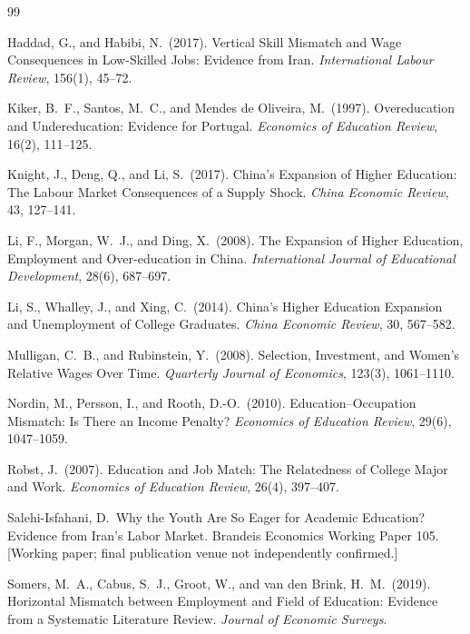 \documentclass[11pt]{article}
\begin{document}

\begin{thebibliography}{99}

Haddad, G., and Habibi, N.\ (2017). Vertical Skill Mismatch and Wage Consequences in Low-Skilled Jobs: Evidence from Iran. \emph{International Labour Review}, 156(1), 45--72.

Kiker, B.\ F., Santos, M.\ C., and Mendes de Oliveira, M.\ (1997). Overeducation and Undereducation: Evidence for Portugal. \emph{Economics of Education Review}, 16(2), 111--125.

Knight, J., Deng, Q., and Li, S.\ (2017). China's Expansion of Higher Education: The Labour Market Consequences of a Supply Shock. \emph{China Economic Review}, 43, 127--141.

Li, F., Morgan, W.\ J., and Ding, X.\ (2008). The Expansion of Higher Education, Employment and Over-education in China. \emph{International Journal of Educational Development}, 28(6), 687--697.

Li, S., Whalley, J., and Xing, C.\ (2014). China's Higher Education Expansion and Unemployment of College Graduates. \emph{China Economic Review}, 30, 567--582.

Mulligan, C.\ B., and Rubinstein, Y.\ (2008). Selection, Investment, and Women's Relative Wages Over Time. \emph{Quarterly Journal of Economics}, 123(3), 1061--1110.

Nordin, M., Persson, I., and Rooth, D.-O.\ (2010). Education--Occupation Mismatch: Is There an Income Penalty? \emph{Economics of Education Review}, 29(6), 1047--1059.

Robst, J.\ (2007). Education and Job Match: The Relatedness of College Major and Work. \emph{Economics of Education Review}, 26(4), 397--407.

Salehi-Isfahani, D.\ Why the Youth Are So Eager for Academic Education? Evidence from Iran's Labor Market. Brandeis Economics Working Paper 105. [Working paper; final publication venue not independently confirmed.]

Somers, M.\ A., Cabus, S.\ J., Groot, W., and van den Brink, H.\ M.\ (2019). Horizontal Mismatch between Employment and Field of Education: Evidence from a Systematic Literature Review. \emph{Journal of Economic Surveys}.


\end{thebibliography}
\end{document}
